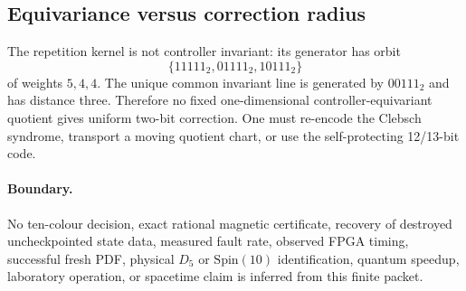 \subsection{Equivariance versus correction radius}
The repetition kernel is not controller invariant: its generator has orbit
\[
 \{11111_2,01111_2,10111_2\}
\]
of weights \(5,4,4\).  The unique common invariant line is generated by
\(00111_2\) and has distance three.  Therefore no fixed one-dimensional
controller-equivariant quotient gives uniform two-bit correction.  One must
re-encode the Clebsch syndrome, transport a moving quotient chart, or use the
self-protecting 12/13-bit code.

\paragraph{Boundary.}
No ten-colour decision, exact rational magnetic certificate, recovery of destroyed uncheckpointed state data, measured fault
rate, observed FPGA timing, successful fresh PDF, physical \(D_5\) or
\(\mathrm{Spin}(10)\) identification, quantum speedup, laboratory operation, or
spacetime claim is inferred from this finite packet.
